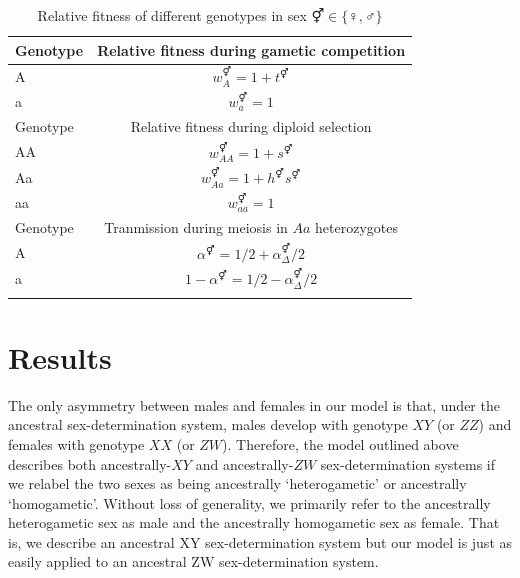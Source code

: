 \documentclass[12pt]{article}
\begin{document}
\begin{table}[ht]
\centering
\smallskip
\caption{Relative fitness of different genotypes in sex $\Hermaphrodite \in \{\female,\male\}$}
\begin{tabular}{l c }
\hline\hline
  Genotype & Relative fitness during gametic competition \\ [0.5ex] \hline
  A & $w_{A}^\Hermaphrodite = 1+t^\Hermaphrodite$ \\
  a & $w_{a}^\Hermaphrodite = 1$ \\ [0.5ex] \hline
  Genotype & Relative fitness during diploid selection \\ [0.5ex] \hline
  AA & $w_{AA}^\Hermaphrodite = 1+ s^\Hermaphrodite$ \\
  Aa & $w_{Aa}^\Hermaphrodite = 1+h^\Hermaphrodite s^\Hermaphrodite$ \\
  aa & $w_{aa}^\Hermaphrodite = 1$ \\ [0.5ex] \hline
  Genotype & Tranmission during meiosis in $Aa$ heterozygotes \\ [0.5ex] \hline
  A & $\alpha^\Hermaphrodite=1/2+\alpha_{\Delta}^{\Hermaphrodite}/2$ \\
  a & $1-\alpha^\Hermaphrodite=1/2-\alpha_{\Delta}^{\Hermaphrodite}/2$ \\
  \hline \hline
  \label{tab:fitnesstable}
 \end{tabular}
\end{table}


\section*{Results}

The only asymmetry between males and females in our model is that, under the ancestral sex-determination system, males develop with genotype $XY$ (or $ZZ$) and females with genotype $XX$ (or $ZW$). 
Therefore, the model outlined above describes both ancestrally-$XY$ and ancestrally-$ZW$ sex-determination systems if we relabel the two sexes as being ancestrally `heterogametic' or ancestrally `homogametic'. 
Without loss of generality, we primarily refer to the ancestrally heterogametic sex as male and the ancestrally homogametic sex as female.
That is, we describe an ancestral XY sex-determination system but our model is just as easily applied to an ancestral ZW sex-determination system. 
\end{document}
